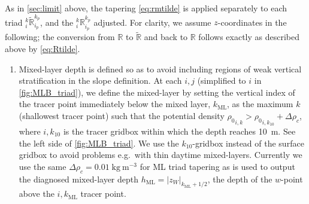 \documentclass[../tex_main/NEMO_manual]{subfiles}
\begin{document}
As in \autoref{sec:limit} above, the tapering
\autoref{eq:rmtilde} is applied separately to each triad
$_i^k\tilde{\mathbb{R}}_{i_p}^{k_p}$, and the
$_i^k\mathbb{R}_{i_p}^{k_p}$ adjusted. For clarity, we assume
$z$-coordinates in the following; the conversion from
$\mathbb{R}$ to $\tilde{\mathbb{R}}$ and back to $\mathbb{R}$ follows exactly as described
above by \autoref{eq:Rtilde}.
\begin{enumerate}
\item Mixed-layer depth is defined so as to avoid including regions of weak
vertical stratification in the slope definition.
 At each $i,j$ (simplified to $i$ in
\autoref{fig:MLB_triad}), we define the mixed-layer by setting
the vertical index of the tracer point immediately below the mixed
layer, $k_{\mathrm{ML}}$, as the maximum $k$ (shallowest tracer point)
such that the potential density
${\rho_0}_{i,k}>{\rho_0}_{i,k_{10}}+\Delta\rho_c$, where $i,k_{10}$ is
the tracer gridbox within which the depth reaches 10~m. See the left
side of \autoref{fig:MLB_triad}. We use the $k_{10}$-gridbox
instead of the surface gridbox to avoid problems e.g.\ with thin
daytime mixed-layers. Currently we use the same
$\Delta\rho_c=0.01\;\mathrm{kg\:m^{-3}}$ for ML triad tapering as is
used to output the diagnosed mixed-layer depth
$h_{\mathrm{ML}}=|z_{W}|_{k_{\mathrm{ML}}+1/2}$, the depth of the $w$-point
above the $i,k_{\mathrm{ML}}$ tracer point.


\end{enumerate}
\end{document}
